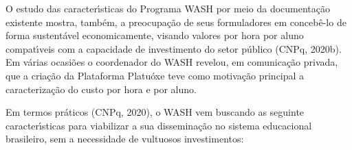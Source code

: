 \documentclass[
12pt,		%
openright,	%
twoside,  %
a4paper,			%
chapter=TITLE,		%
english,			%
french,				%
spanish,			%
brazil				%
]{USPSC-classe/USPSC}
\begin{document}
O estudo das caracter\'{\i}sticas do Programa WASH por meio da documenta\c{c}\~ao existente mostra, tamb\'em, a preocupa\c{c}\~ao de seus formuladores em conceb\^e-lo de forma sustent\'avel economicamente, visando valores por hora por aluno compat\'{\i}veis com a capacidade de investimento do setor p\'ublico  (CNPq, 2020b). Em v\'arias ocasi\~oes o coordenador do WASH revelou, em comunica\c{c}\~ao privada, que a cria\c{c}\~ao da Plataforma Platu\'oxe teve como motiva\c{c}\~ao principal a caracteriza\c{c}\~ao do custo por hora e por aluno.

















Em termos pr\'aticos  (CNPq, 2020), o WASH vem buscando as seguinte caracter\'{\i}sticas para viabilizar a sua dissemina\c{c}\~ao no sistema educacional brasileiro, sem a necessidade de vultuosos investimentos:
\end{document}
